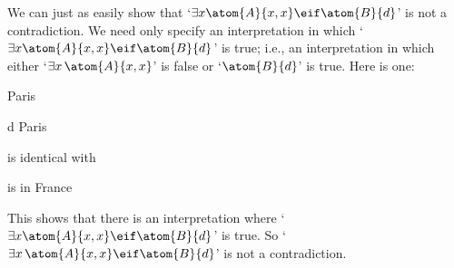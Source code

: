 We can just as easily show that `$\exists x\atom{A}{x,x} \eif \atom{B}{d}$' is not a contradiction. We need only specify an interpretation in which `$\exists x\atom{A}{x,x} \eif \atom{B}{d}$' is true; i.e., an interpretation in which either `$\exists x\, \atom{A}{x,x}$' is false or `$\atom{B}{d}$' is true. Here is one:
	\begin{ekey}
		\item[\text{domain}] Paris
		\item[d] Paris
		\item[\atom{A}{x,y}]  is identical with 
		\item[\atom{B}{x}]  is in France
	\end{ekey}
This shows that there is an interpretation where `$\exists x\atom{A}{x,x} \eif \atom{B}{d}$' is true. So `$\exists x\, \atom{A}{x,x} \eif \atom{B}{d}$' is not a contradiction.

